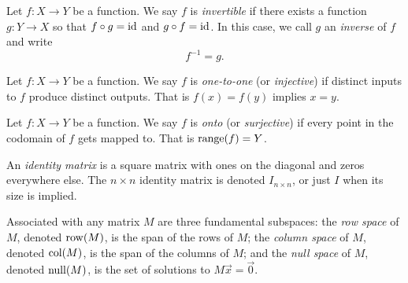 \begin{SaveDefinition}[
	key=InverseFunction,
	title={Inverse Function}]

	Let $f:X\to Y$ be a function. We say $f$ is \emph{invertible} if
	there exists a function $g:Y\to X$ so that $f\circ g=\operatorname{\operatorname{id}}$ and $g\circ f=\operatorname{\operatorname{id}}$.
	In this case, we call $g$ an \emph{inverse} of $f$ and write
	\[
		f^{-1}=g.
	\]
\end{SaveDefinition}

\begin{SaveDefinition}[
	key=Onetoone,
	title={One-to-one}]

	Let $f:X\to Y$ be a function. We say $f$ is \emph{one-to-one} (or \emph{injective}) if
	distinct inputs to $f$ produce distinct outputs. That is $f(x)=f(y)$ implies $x=y$.
\end{SaveDefinition}

\begin{SaveDefinition}[
	key=Onto,
	title={Onto}]

	Let $f:X\to Y$ be a function.
	We say $f$ is \emph{onto} (or \emph{surjective}) if every point in the codomain of $f$ gets mapped to.
	That is $\operatorname{range}(f)=Y$.
\end{SaveDefinition}

\begin{SaveDefinition}[
	key=IdentityMatrix,
	title={Identity Matrix}]

	An \emph{identity matrix} is a square matrix with ones on the diagonal
	and zeros everywhere else. The $n\times n$ identity matrix is denoted $I_{n\times n}$,
	or just $I$ when its size is implied.
\end{SaveDefinition}

\begin{SaveDefinition}[key=FundamentalSubspaces, title={Fundamental Subspaces}]
	Associated with any matrix $M$ are three fundamental subspaces: the
	\emph{row space} of $M$, denoted $\operatorname{row}(M)$, is the span of the rows of
	$M$; the
	\emph{column space} of $M$, denoted $\operatorname{col}(M)$, is the span of the
	columns of $M$; and the
	\emph{null space} of $M$, denoted $\operatorname{null}(M)$, is the set of solutions to
	$M\vec x=\vec 0$.
\end{SaveDefinition}

